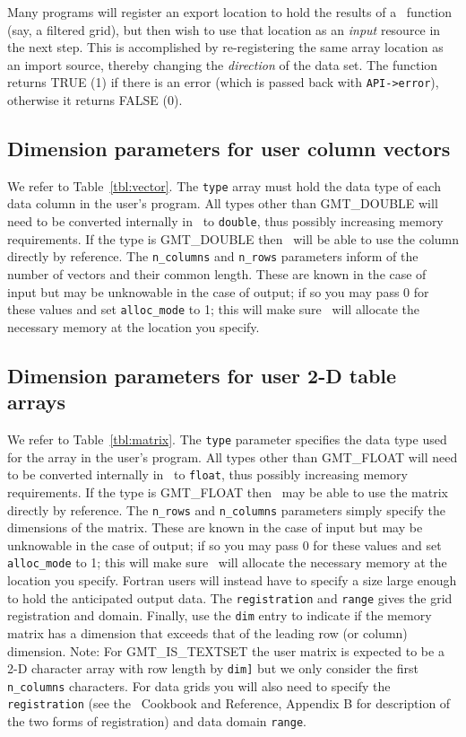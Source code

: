\documentclass[11pt]{report}
\begin{document}
Many programs will register an export location to hold the results of a \GMT\ function (say,
a filtered grid), but then wish to use that location as an \emph{input} resource in the next
step.  This is accomplished by re-registering the same array
location as an import source, thereby changing the \emph{direction} of the data set.
The function returns TRUE (1) if there is an error (which is passed back with \texttt{API->error}),
otherwise it returns FALSE (0).

\subsection{Dimension parameters for user column vectors}
We refer to Table~\ref{tbl:vector}.  The \texttt{type} array must hold the
data type of each data column in the user's program.  All types other than GMT\_DOUBLE will need
to be converted internally in \GMT\ to \texttt{double}, thus possibly increasing memory requirements.
If the type is GMT\_DOUBLE then \GMT\ will be able to use the column directly by reference.  The \texttt{n\_columns}
and \texttt{n\_rows} parameters inform of the number of vectors and their common length.  These are known in
the case of input but may be unknowable in the case of output; if so you may pass 0 for these values
and set \texttt{alloc\_mode} to 1; this will make
sure \GMT\ will allocate the necessary memory at the location you specify.

\subsection{Dimension parameters for user 2-D table arrays}

We refer to Table~\ref{tbl:matrix}.  The \texttt{type} parameter specifies the
data type used for the array in the user's program.  All types other than GMT\_FLOAT will need
to be converted internally in \GMT\ to \texttt{float}, thus possibly increasing memory requirements.
If the type is GMT\_FLOAT then \GMT\ may be able to use the matrix directly by reference.  The \texttt{n\_rows}
and \texttt{n\_columns} parameters simply specify the dimensions of the matrix.  These are known in
the case of input but may be unknowable in the case
of output; if so you may pass 0 for these values and set \texttt{alloc\_mode} to 1; this will make
sure \GMT\ will allocate the necessary memory at the location you specify.  Fortran users
will instead have to specify a size large enough to hold the anticipated output data.
The \texttt{registration} and \texttt{range} gives the grid registration and domain.
Finally, use the \texttt{dim} entry to indicate if the memory matrix has a dimension that
exceeds that of the leading row (or column) dimension. Note: For GMT\_IS\_TEXTSET
the user matrix is expected to be a 2-D character array with row length by \texttt{dim]}
but we only consider the first \texttt{n\_columns} characters.  For data grids you will
also need to specify the \texttt{registration}  (see the \GMT\ Cookbook and Reference,
Appendix B for description of the two forms of registration) and data domain \texttt{range}.
\end{document}

